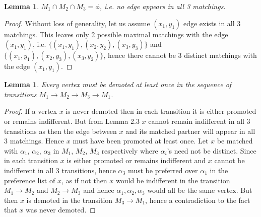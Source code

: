 \documentclass[a4paper,10pt]{article}
\theoremstyle{plain} %
\newtheorem{lemma}[theorem]{Lemma} %
\theoremstyle{plain} %
\begin{document}



\begin{lemma}
$M_1 \cap M_2 \cap M_3 = \phi$, i.e. no edge appears in all 3 matchings.
\end{lemma}

\begin{proof}
Without loss of generality, let us assume $(x_1, y_1)$ edge exists in all 3 matchings. This leaves only 2 possible maximal matchings with the edge $(x_1, y_1)$, i.e. $\{(x_1, y_1), (x_2, y_2), (x_3, y_3)\}$ and $\{(x_1, y_1), (x_2, y_3), (x_3, y_2)\}$, hence there cannot be 3 distinct matchings with the edge $(x_1, y_1)$.
\end{proof}

\begin{lemma}
Every vertex must be demoted at least once in the sequence of transitions $M_1 \rightarrow M_2 \rightarrow M_3 \rightarrow M_1$.
\end{lemma}

\begin{proof}
If a vertex $x$ is never demoted then in each transition it is either promoted or remains indifferent. But from Lemma 2.3 $x$ cannot remain indifferent in all 3 transitions as then the edge between $x$ and its matched partner will appear in all 3 matchings. Hence $x$ must have been promoted at least once. Let $x$ be matched with $\alpha_1$, $\alpha_2$, $\alpha_3$ in $M_1$, $M_2$, $M_3$ respectively where $\alpha_i$'s need not be distinct. Since in each transition $x$ is either promoted or remains indifferent and $x$ cannot be indifferent in all 3 transitions, hence $\alpha_3$ must be preferred over $\alpha_1$ in the preference list of $x$, as if not then $x$ would be indifferent in the transition $M_1 \rightarrow M_2$ and $M_2 \rightarrow M_3$ and hence $\alpha_1, \alpha_2, \alpha_3$ would all be the same vertex. But then $x$ is demoted in the transition $M_3 \rightarrow M_1$, hence a contradiction to the fact that $x$ was never demoted. 
\end{proof}
\end{document}
